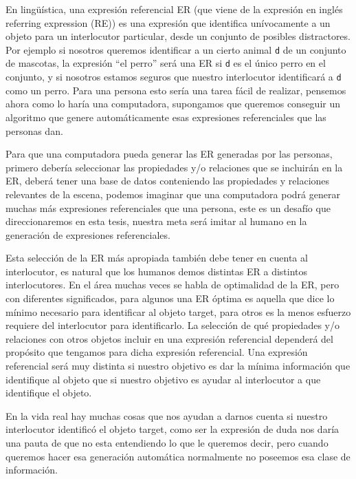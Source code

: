 En ling\"u\'{i}stica, una expresi\'on referencial ER (que viene de la expresi\'on en ingl\'es referring expression (RE)) es una expresi\'on que identifica un\'ivocamente a un objeto para un interlocutor particular, desde un conjunto de posibles distractores. Por ejemplo si nosotros queremos identificar a un cierto animal \texttt{d} de un conjunto de mascotas, la expresi\'on ``el perro'' ser\'a una ER si \texttt{d} es el \'unico perro en el conjunto, y si nosotros estamos seguros que nuestro interlocutor identificar\'a a \texttt{d} como un perro. Para una persona esto ser\'ia una tarea f\'acil de realizar, pensemos ahora como lo har\'ia una computadora, supongamos que queremos conseguir un algoritmo que genere autom\'aticamente esas expresiones referenciales que las personas dan.

 Para que una computadora pueda generar las ER generadas por las personas, primero deber\'ia seleccionar las propiedades y/o relaciones que se incluir\'an en la ER, deber\'a tener una base de datos conteniendo las propiedades y relaciones relevantes de la escena, podemos imaginar que una computadora podr\'a generar muchas m\'as expresiones referenciales que una persona, este es un desaf\'io que direccionaremos en esta tesis, nuestra meta ser\'a imitar al humano en la generaci\'on de expresiones referenciales. 

Esta selecci\'on de la ER m\'as apropiada tambi\'en debe tener en cuenta al interlocutor, es natural que los humanos demos distintas ER a distintos interlocutores. En el \'area muchas veces se habla de optimalidad de la ER, pero con diferentes significados, para algunos una ER \'optima es aquella que dice lo m\'inimo necesario para identificar al objeto target, para otros es la menos esfuerzo requiere del interlocutor para identificarlo.
La selecci\'on de qu\'e propiedades y/o relaciones con otros objetos incluir en una expresi\'on referencial depender\'a del prop\'osito que tengamos para dicha expresi\'on referencial. Una expresi\'on referencial ser\'a muy distinta si nuestro objetivo es dar la m\'inima informaci\'on que identifique al objeto que si nuestro objetivo es ayudar al interlocutor a que identifique el objeto.

En la vida real hay muchas cosas que nos ayudan a darnos cuenta si nuestro interlocutor identific\'o el objeto target, como ser la expresi\'on de duda nos dar\'ia una pauta de que no esta entendiendo lo que le queremos decir, pero cuando queremos hacer esa generaci\'on autom\'atica normalmente no poseemos esa clase de informaci\'on.

